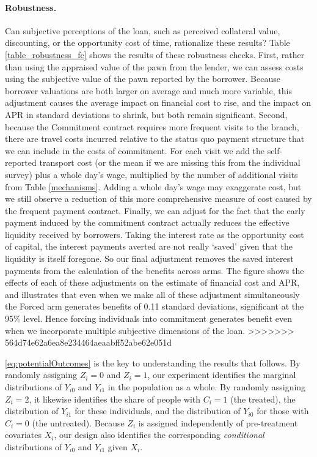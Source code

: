 \documentclass[oneside,11pt]{article}
\begin{document}
\paragraph{Robustness.} Can subjective perceptions of the loan, such as perceived collateral value, discounting, or the opportunity cost of time, rationalize these results?  Table \ref{table_robustness_fc} shows the results of these robustness checks.  First, rather than using the appraised value of the pawn from the lender, we can assess costs using the subjective value of the pawn reported by the borrower.  Because borrower valuations are both larger on average and much more variable, this adjustment causes the average impact on financial cost to rise, and the impact on APR in standard deviations to shrink, but both remain significant.   Second, because the Commitment contract requires more frequent visits to the branch, there are travel costs incurred relative to the status quo payment structure that we can include in the costs of commitment.  For each visit we add the self-reported transport cost (or the mean if we are missing this from the individual survey) plus a whole day's wage, multiplied by the number of additional visits from Table \ref{mechanisms}. Adding a whole day's wage may exaggerate cost, but we still observe a reduction of this more comprehensive measure of cost caused by the frequent payment contract. Finally, we can adjust for the fact that the early payment induced by the commitment contract actually reduces the effective liquidity received by borrowers.  Taking the interest rate as the opportunity cost of capital, the interest payments averted are not really `saved' given that the liquidity is itself foregone.  So our final adjustment removes the saved interest payments from the calculation of the benefits across arms.  The figure shows the effects of each of these adjustments on the estimate of financial cost and APR, and illustrates that even when we make all of these adjustment simultaneously the Forced arm generates benefits of 0.11 standard deviations, significant at the 95\% level.  Hence forcing individuals into commitment generates benefit even when we incorporate multiple subjective dimensions of the loan.
>>>>>>> 564d74e62a6ea8e234464aeaabff52abe62e051d

\eqref{eq:potentialOutcomes} is the key to understanding the results that follows. 
By randomly assigning $Z_i=0$ and $Z_i = 1$, our experiment identifies the marginal distributions of $Y_{i0}$ and $Y_{i1}$ in the population as a whole. 
By randomly assigning $Z_i=2$, it likewise identifies the share of people with $C_i = 1$ (the treated), the distribution of $Y_{i1}$ for these individuals, and the distribution of $Y_{i0}$ for those with $C_i = 0$ (the untreated). 
Because $Z_i$ is assigned independently of pre-treatment covariates $X_i$, our design also identifies the corresponding \emph{conditional} distributions of $Y_{i0}$ and $Y_{i1}$ given $X_i$. 
\end{document}
